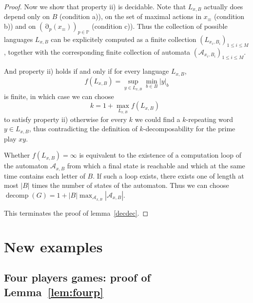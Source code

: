 \documentclass[a4paper,UKenglish]{lipics-v2016}
\newcommand{\PP}{\mathbb{P}}
\renewcommand{\AA}{\mathcal{A}}
\DeclareMathOperator{\view}{\partial}
\DeclareMathOperator{\decomp}{decomp}
\begin{document}
\begin{proof}
\medskip

Now we show that property ii) is decidable.
Note that $L_{x,B}$ actually does depend only on $B$ (condition a)),
on the set of maximal actions in $x_\equiv$ (condition b)) and on
$(\view_p(x_\equiv))_{p\in\PP}$ (condition c)).
Thus the collection of possible languages $L_{x,B}$ can be explicitely computed
as a finite collection $(L_{x_i,B_i})_{1 \leq i \leq M}$,
together with the corresponding finite collection of automata $(\AA_{x_i,B_i})_{1 \leq i \leq M}$.

And property ii) holds if and only if
for every language $L_{x,B}$,
\[
f(L_{x,B}) = \sup_{y\in L_{x,B}} \min_{b \in B } |y|_b
\]
is finite, in which case we can choose
\[
k = 
1+ \max_{L_{x,B}} f(L_{x,B})\enspace
\]
to satisfy property ii) otherwise for every $k$ we could find a $k$-repeating word $y \in L_{x,B}$,
thus contradicting the definition of 
$k$-decomposability for the prime play $xy$.

Whether $f(L_{x,B})= \infty$
is equivalent to the existence of a computation loop of the automaton  $\AA_{x,B}$ from which a final state is reachable
and which at the same time contains each letter of $B$.
If such a loop exists, there exists one of length at most $|B|$ times the number of states of the automaton.
Thus we can choose $\decomp(G)=1 + |B| \max_{\AA_{x,B}} |\AA_{x,B}|$.

This terminates the proof of lemma~\ref{decdec}.
\end{proof}













\section{New examples}




\subsection{Four players games: proof of Lemma~\ref{lem:fourp}}
\end{document}
